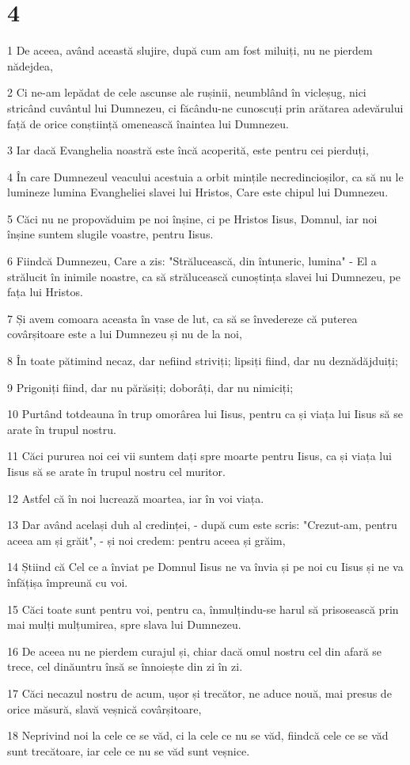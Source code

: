 \chapter{4}

\par 1 De aceea, având această slujire, după cum am fost miluiți, nu ne pierdem nădejdea,
\par 2 Ci ne-am lepădat de cele ascunse ale rușinii, neumblând în vicleșug, nici stricând cuvântul lui Dumnezeu, ci făcându-ne cunoscuți prin arătarea adevărului față de orice conștiință omenească înaintea lui Dumnezeu.
\par 3 Iar dacă Evanghelia noastră este încă acoperită, este pentru cei pierduți,
\par 4 În care Dumnezeul veacului acestuia a orbit mințile necredincioșilor, ca să nu le lumineze lumina Evangheliei slavei lui Hristos, Care este chipul lui Dumnezeu.
\par 5 Căci nu ne propovăduim pe noi înșine, ci pe Hristos Iisus, Domnul, iar noi înșine suntem slugile voastre, pentru Iisus.
\par 6 Fiindcă Dumnezeu, Care a zis: "Strălucească, din întuneric, lumina" - El a strălucit în inimile noastre, ca să strălucească cunoștința slavei lui Dumnezeu, pe fața lui Hristos.
\par 7 Și avem comoara aceasta în vase de lut, ca să se învedereze că puterea covârșitoare este a lui Dumnezeu și nu de la noi,
\par 8 În toate pătimind necaz, dar nefiind striviți; lipsiți fiind, dar nu deznădăjduiți;
\par 9 Prigoniți fiind, dar nu părăsiți; doborâți, dar nu nimiciți;
\par 10 Purtând totdeauna în trup omorârea lui Iisus, pentru ca și viața lui Iisus să se arate în trupul nostru.
\par 11 Căci pururea noi cei vii suntem dați spre moarte pentru Iisus, ca și viața lui Iisus să se arate în trupul nostru cel muritor.
\par 12 Astfel că în noi lucrează moartea, iar în voi viața.
\par 13 Dar având același duh al credinței, - după cum este scris: "Crezut-am, pentru aceea am și grăit", - și noi credem: pentru aceea și grăim,
\par 14 Știind că Cel ce a înviat pe Domnul Iisus ne va învia și pe noi cu Iisus și ne va înfățișa împreună cu voi.
\par 15 Căci toate sunt pentru voi, pentru ca, înmulțindu-se harul să prisosească prin mai mulți mulțumirea, spre slava lui Dumnezeu.
\par 16 De aceea nu ne pierdem curajul și, chiar dacă omul nostru cel din afară se trece, cel dinăuntru însă se înnoiește din zi în zi.
\par 17 Căci necazul nostru de acum, ușor și trecător, ne aduce nouă, mai presus de orice măsură, slavă veșnică covârșitoare,
\par 18 Neprivind noi la cele ce se văd, ci la cele ce nu se văd, fiindcă cele ce se văd sunt trecătoare, iar cele ce nu se văd sunt veșnice.

